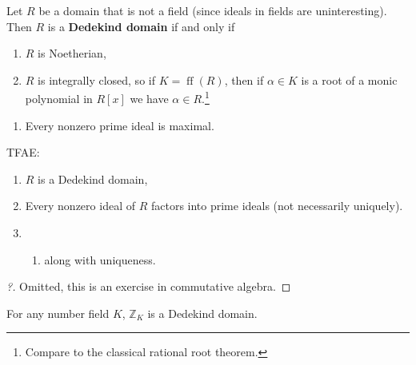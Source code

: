 \begin{definition}[?]

Let \(R\) be a domain that is not a field (since ideals in fields are
uninteresting). Then \(R\) is a \textbf{Dedekind domain} if and only if

\begin{enumerate}
\def\labelenumi{\alph{enumi}.}
\item
  \(R\) is Noetherian,
\item
  \(R\) is integrally closed, so if \(K = \operatorname{ff}(R)\), then
  if \(\alpha\in K\) is a root of a monic polynomial in \(R[x]\) we have
  \(\alpha\in R\).\footnote{Compare to the classical rational root
    theorem.}
\end{enumerate}

\begin{enumerate}
\def\labelenumi{\alph{enumi}.}
\setcounter{enumi}{2}
\tightlist
\item
  Every nonzero prime ideal is maximal.
\end{enumerate}

\end{definition}

\begin{theorem}[Noether]

TFAE:

\begin{enumerate}
\def\labelenumi{\arabic{enumi}.}
\item
  \(R\) is a Dedekind domain,
\item
  Every nonzero ideal of \(R\) factors into prime ideals (not
  necessarily uniquely).
\item
  \begin{enumerate}
  \def\labelenumii{(\arabic{enumii})}
  \setcounter{enumii}{1}
  \tightlist
  \item
    along with uniqueness.
  \end{enumerate}
\end{enumerate}

\end{theorem}

\begin{proof}[?]

Omitted, this is an exercise in commutative algebra.

\end{proof}

\begin{proposition}[?]

For any number field \(K\), \({\mathbb{Z}}_K\) is a Dedekind domain.

\end{proposition}

